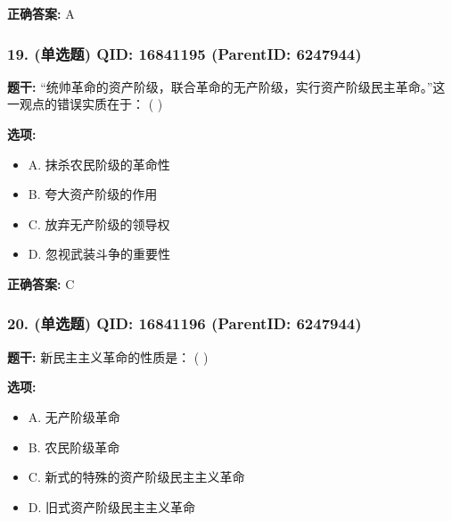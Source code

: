 \documentclass[12pt,UTF8]{ctexart}
\begin{document}
\textbf{正确答案:}
A

\vspace{0.3em}\hrulefill\vspace{0.7em}

\subsubsection*{19. (单选题) \small QID: 16841195 (ParentID: 6247944)}

\textbf{题干:}
“统帅革命的资产阶级，联合革命的无产阶级，实行资产阶级民主革命。”这一观点的错误实质在于： ( )



\textbf{选项:}
\begin{itemize}[leftmargin=*]

  \item A. 抹杀农民阶级的革命性

  \item B. 夸大资产阶级的作用

  \item C. 放弃无产阶级的领导权

  \item D. 忽视武装斗争的重要性

\end{itemize}

\textbf{正确答案:}
C

\vspace{0.3em}\hrulefill\vspace{0.7em}

\subsubsection*{20. (单选题) \small QID: 16841196 (ParentID: 6247944)}

\textbf{题干:}
新民主主义革命的性质是： ( )



\textbf{选项:}
\begin{itemize}[leftmargin=*]

  \item A. 无产阶级革命

  \item B. 农民阶级革命

  \item C. 新式的特殊的资产阶级民主主义革命

  \item D. 旧式资产阶级民主主义革命

\end{itemize}
\end{document}
